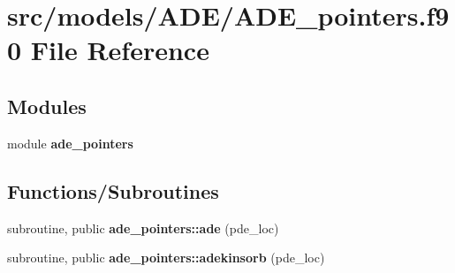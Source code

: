 \section{src/models/\+A\+D\+E/\+A\+D\+E\+\_\+pointers.f90 File Reference}
\label{_a_d_e__pointers_8f90}
\subsection*{Modules}
\begin{DoxyCompactItemize}
\item 
module {\bf ade\+\_\+pointers}
\end{DoxyCompactItemize}
\subsection*{Functions/\+Subroutines}
\begin{DoxyCompactItemize}
\item 
subroutine, public {\bf ade\+\_\+pointers\+::ade} (pde\+\_\+loc)
\item 
subroutine, public {\bf ade\+\_\+pointers\+::adekinsorb} (pde\+\_\+loc)
\end{DoxyCompactItemize}
